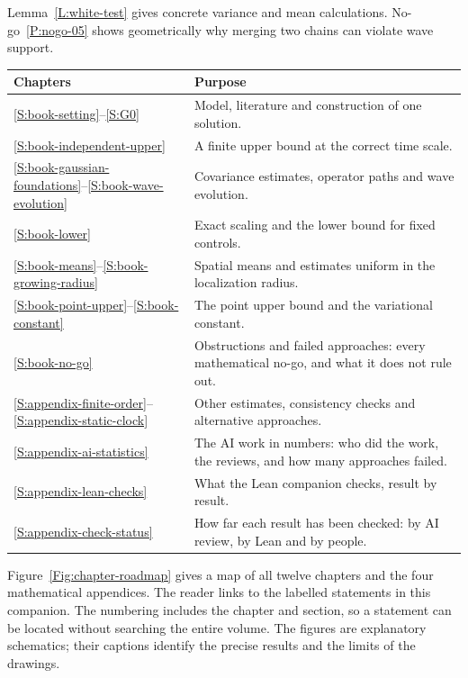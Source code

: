 \documentclass[12pt,oneside,openany]{book}
\numberwithin{equation}{section}
\theoremstyle{nogostyle}
\theoremstyle{definition}
\begin{document}
Lemma~\ref{L:white-test} gives concrete variance and mean calculations.
No-go~\ref{P:nogo-05} shows geometrically why merging two chains can violate
wave support.

\begin{center}
\begin{tabular}{@{}p{}p{}@{}}
  \toprule
  Chapters & Purpose \\
  \midrule
  \ref{S:book-setting}--\ref{S:G0} & Model, literature and construction of one solution. \\
  \ref{S:book-independent-upper} & A finite upper bound at the correct time scale. \\
  \ref{S:book-gaussian-foundations}--\ref{S:book-wave-evolution} & Covariance estimates, operator paths and wave evolution. \\
  \ref{S:book-lower} & Exact scaling and the lower bound for fixed controls. \\
  \ref{S:book-means}--\ref{S:book-growing-radius} & Spatial means and estimates uniform in the localization radius. \\
  \ref{S:book-point-upper}--\ref{S:book-constant} & The point upper bound and the variational constant. \\
  \ref{S:book-no-go} & Obstructions and failed approaches: every mathematical no-go, and what it does not rule out. \\
  \midrule
  \ref{S:appendix-finite-order}--\ref{S:appendix-static-clock} & Other estimates, consistency checks and alternative approaches. \\
  \ref{S:appendix-ai-statistics} & The AI work in numbers: who did the work, the reviews, and how many approaches failed. \\
  \ref{S:appendix-lean-checks} & What the Lean companion checks, result by result. \\
  \ref{S:appendix-check-status} & How far each result has been checked: by AI review, by Lean and by people. \\
  \bottomrule
\end{tabular}
\end{center}

Figure~\ref{Fig:chapter-roadmap} gives a map of all twelve chapters and the
four mathematical appendices. The reader links to the labelled statements in this companion. The numbering
includes the chapter and section, so a statement can be located
without searching the entire volume. The figures are explanatory schematics;
their captions identify the precise results and the limits of the drawings.
\end{document}
